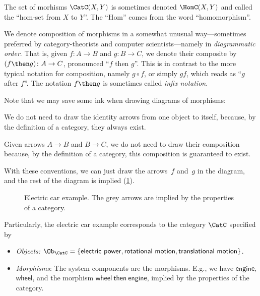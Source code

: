 \begin{remark}
The set of morhisms $\CatC(X, Y)$ is sometimes denoted $\HomC(X, Y)$ and called the ``hom-set from $X$ to $Y$''. The ``Hom'' comes from the word ``homomorphism''.
\end{remark}

\begin{remark}
We denote composition of morphisms in a somewhat unusual way---sometimes preferred by category-theorists and computer scientists---namely in \emph{diagrammatic order}. That is, given $f\colon A\to B$ and $g\colon B\to C$, we denote their composite by $(f\then g)\colon A\to C$, pronounced ``$f$ then $g$''. This is in contrast to the more typical notation for composition, namely $g\circ f$, or simply $gf$, which reads as ``$g$ after $f$''. The notation $f\then g$ is sometimes called \emph{infix notation}.
\end{remark}


\noindent Note that we may save some ink when drawing diagrams of morphisms:
\begin{compactitem}
\item We do not need to draw the identity arrows from one object to itself, because, by the definition of a category, they always exist.
\item  Given arrows $A\to B$ and $B \to C$, we do not need to draw their composition because, by the definition of a category, this composition is guaranteed to exist.
\end{compactitem}

With these conventions, we can just draw the arrows~$f$ and~$g$ in the diagram,
and the rest of the diagram is implied (\cref{fig:e5}). 

\begin{figure}[h!]
    \centering
    \caption{\label{fig:e5} Electric car example. The grey arrows are implied by the properties
    of a category.}
\end{figure}

Particularly, the electric car example corresponds to the category $\CatC$ specified by
\begin{itemize}
    \item \emph{Objects:} $\Ob_\CatC=\{\mathsf{electric}\ \mathsf{power},\mathsf{rotational}\ \mathsf{motion},\mathsf{translational}\ \mathsf{motion}\}$.
    \item \emph{Morphisms}: The system components are the morphisms. E.g., we have $\mathsf{engine}$, $\mathsf{wheel}$, and the morphism $\mathsf{wheel \ then \ engine}$, implied by the properties of the category.
\end{itemize}

